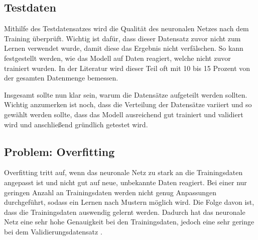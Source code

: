 \subsection{Testdaten}
Mithilfe des Testdatensatzes wird die Qualität des neuronalen Netzes nach dem Training überprüft. Wichtig ist dafür, dass dieser Datensatz zuvor nicht zum Lernen verwendet wurde, 
damit diese das Ergebnis nicht verfälschen.
So kann festgestellt werden, wie das Modell auf Daten reagiert, welche nicht zuvor trainiert wurden. \cite[Seite 80f]{CA18}
In der Literatur wird dieser Teil oft mit 10 bis 15 Prozent von der gesamten Datenmenge bemessen.


Insgesamt sollte nun klar sein, warum die Datensätze aufgeteilt werden sollten. 
Wichtig anzumerken ist noch, dass die Verteilung der Datensätze variiert und so gewählt werden sollte, dass das Modell ausreichend gut trainiert und validiert wird und anschließend gründlich getestet wird.

\subsection{Problem: Overfitting}
Overfitting tritt auf, wenn das neuronale Netz zu stark an die Trainingsdaten angepasst ist und nicht gut auf neue, unbekannte Daten reagiert. 
Bei einer nur geringen Anzahl an Trainingsdaten werden nicht genug Anpassungen durchgeführt, sodass ein Lernen nach Mustern möglich wird. Die Folge davon ist, dass die Trainingsdaten auswendig gelernt werden.
Dadurch hat das neuronale Netz eine sehr hohe Genauigkeit bei den Trainingsdaten, jedoch eine sehr geringe bei dem Validierungsdatensatz \cite[Seite 25]{CA18}. 